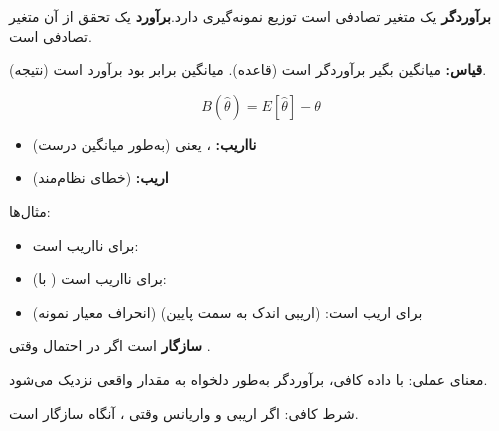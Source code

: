 
\textbf{برآوردگر} یک متغیر تصادفی است  توزیع نمونه‌گیری دارد.\PSbr{}\textbf{برآورد} یک تحقق از آن متغیر تصادفی است.

\textbf{قیاس:} میانگین بگیر برآوردگر است (قاعده). میانگین برابر  بود برآورد است (نتیجه).



\[B(\hat{\theta}) = E[\hat{\theta}] - \theta\]

\begin{itemize}
\tightlist
\item
  \textbf{نااریب:} ، یعنی  (به‌طور میانگین درست)
\item
  \textbf{اریب:}  (خطای نظام‌مند)
\end{itemize}

مثال‌ها:

\begin{itemize}
\tightlist
\item
   برای \lr{\ensuremath{\mu}} نااریب است: 
\item
   (با ) برای  نااریب است: 
\item
   (انحراف معیار نمونه) برای \lr{\ensuremath{\sigma}} اریب است:  (اریبی اندک به سمت پایین)
\end{itemize}


 \textbf{سازگار} است اگر  در احتمال وقتی .

معنای عملی: با داده کافی، برآوردگر به‌طور دلخواه به مقدار واقعی نزدیک می‌شود.

شرط کافی: اگر اریبی  و واریانس  وقتی ، آنگاه سازگار است.


